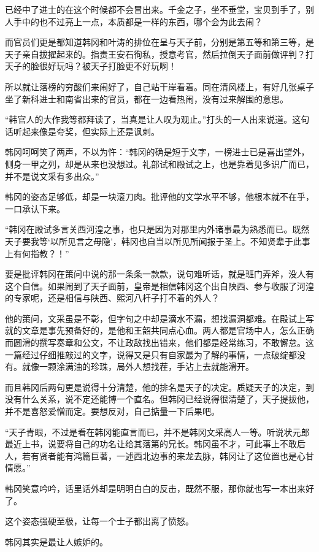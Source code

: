 已经中了进士的在这个时候都不会冒出来。千金之子，坐不垂堂，宝贝到手了，别人手中的也不过亮上一点，本质都是一样的东西，哪个会为此去闹？

而官员们更是都知道韩冈和叶涛的排位在呈与天子前，分别是第五等和第三等，是天子亲自拔擢起来的。指责王安石徇私，授意考官，然后拉倒天子面前做评判？打天子的脸很好玩吗？被天子打脸更不好玩啊！

所以就让落榜的穷酸们来闹好了，自己站干岸看着。同在清风楼上，有好几张桌子坐了新科进士和南省出来的官员，都在一边看热闹，没有过来解围的意思。

“韩官人的大作我等都拜读了，当真是让人叹为观止。”打头的一人出来说道。这句话听起来像是夸奖，但实际上还是讽刺。

韩冈呵呵笑了两声，不以为忤：“韩冈的确是短于文字，一榜进士已是喜出望外，侧身一甲之列，却是从来也没想过。礼部试和殿试之上，也是靠着见多识广而已，并不是说文采有多出众。”

韩冈的姿态足够低，却是一块滚刀肉。批评他的文学水平不够，他根本就不在乎，一口承认下来。

“韩冈在殿试多言关西河湟之事，也只是因为对那里内外诸事最为熟悉而已。既然天子要我等‘以所见言之毋隐’，韩冈也自当以所见所闻报于圣上。不知贤辈于此事上有何指教？！”

要是批评韩冈在策问中说的那一条条一款款，说句难听话，就是班门弄斧，没人有这个自信。如果闹到了天子面前，皇帝是相信韩冈这个出自陕西、参与收服了河湟的专家呢，还是相信与陕西、熙河八杆子打不着的外人？

他的策问，文采虽是不彰，但字句之中却是滴水不漏，想找漏洞都难。在殿试上写就的文章是事先预备好的，是他和王韶共同点心血。两人都是官场中人，怎么正确而圆滑的撰写奏章和公文，不让政敌找出错来，他们都是经常练习，不敢懈怠。这一篇经过仔细推敲过的文字，说得又是只有自家最为了解的事情，一点破绽都没有。就像一颗涂满油的珍珠，局外人想找茬，手沾上去就能滑开。

而且韩冈后两句更是说得十分清楚，他的排名是天子的决定。质疑天子的决定，到没有什么关系，说不定还能博一个直名。但韩冈已经说得很清楚了，天子提拔他，并不是喜怒爱憎而定。要想反对，自己掂量一下后果吧。

“天子青眼，不过是看在韩冈能直言而已，并不是韩冈文采高人一等。听说状元郎最近上书，说要将自己的功名让给其落第的兄长。韩冈虽不才，可此事上不敢后人，若有贤者能有鸿篇巨著，一述西北边事的来龙去脉，韩冈让了这位置也是心甘情愿。”

韩冈笑意吟吟，话里话外却是明明白白的反击，既然不服，那你就也写一本出来好了。

这个姿态强硬至极，让每一个士子都出离了愤怒。

韩冈其实是最让人嫉妒的。

